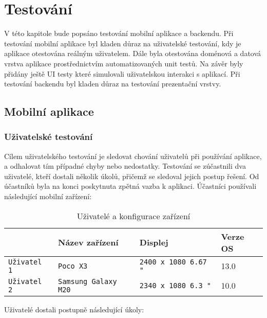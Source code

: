 \chapter{Testování}

\begin{chapterabstract}
V této kapitole bude popsáno testování mobilní aplikace a backendu. Při testování mobilní aplikace byl kladen důraz na uživatelské testování, kdy je aplikace otestována reálným uživatelem. Dále byla otestována doménová a datová vrstva aplikace prostřednictvím automatizovaných unit testů. Na závěr byly přidány ještě UI testy které simulovali uživatelskou interakci s aplikací. Při testování backendu byl kladen důraz na testování prezentační vrstvy.
\end{chapterabstract}


\section{Mobilní aplikace}

\subsection{Uživatelské testování}
Cílem uživatelského testování je sledovat chování uživatelů při používání aplikace, a odhalovat tím případné chyby nebo nedostatky. Testování se zúčastnili dva uživatelé, kteří dostali několik úkolů, přičemž se sledoval jejich postup řešení. Od účastníků byla na konci poskytnuta zpětná vazba k aplikaci. Účastníci používali následující mobilní zařízení:

\begin{table}[!h]\centering
	\caption[Použitá testovací zařízení]{Uživatelé a konfigurace zařízení}
	\begin{tabular}{|l|l|l|p{4cm}|}\hline
		& Název zařízení	& Displej	& Verze OS \tabularnewline \hline \hline
		\texttt{Uživatel 1} & \texttt{Poco X3}		& \texttt{2400 x 1080 6.67 "}	& 13.0		\tabularnewline \hline
		
		\texttt{Uživatel 2} & \texttt{Samsung Galaxy M20}		& \texttt{2340 x 1080 6.3 "}	& 10.0		\tabularnewline \hline
	\end{tabular}
\end{table}

\noindent Uživatelé dostali postupně následující úkoly:

